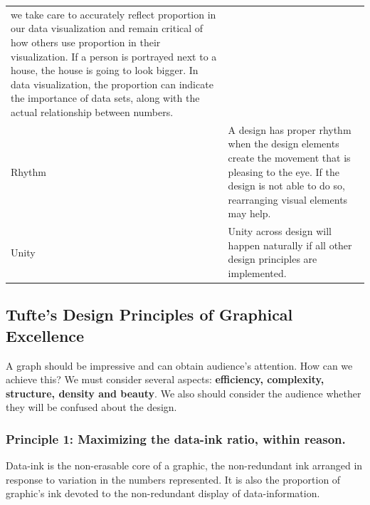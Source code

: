 \documentclass[]{book}
\theoremstyle{definition}
\theoremstyle{definition}
\theoremstyle{definition}
\theoremstyle{remark}
\begin{document}
\begin{longtable}[]{@{}ll@{}}
\begin{minipage}[t]{0.78\columnwidth}
we take care to accurately reflect proportion in our data visualization
and remain critical of how others use proportion in their visualization.
If a person is portrayed next to a house, the house is going to look
bigger. In data visualization, the proportion can indicate the
importance of data sets, along with the actual relationship between
numbers.\strut
\end{minipage}\tabularnewline
\begin{minipage}[t]{0.16\columnwidth}\raggedright\strut
Rhythm\strut
\end{minipage} & \begin{minipage}[t]{0.78\columnwidth}\raggedright\strut
A design has proper rhythm when the design elements create the movement
that is pleasing to the eye. If the design is not able to do so,
rearranging visual elements may help.\strut
\end{minipage}\tabularnewline
\begin{minipage}[t]{0.16\columnwidth}\raggedright\strut
Unity\strut
\end{minipage} & \begin{minipage}[t]{0.78\columnwidth}\raggedright\strut
Unity across design will happen naturally if all other design principles
are implemented.\strut
\end{minipage}\tabularnewline
\bottomrule
\end{longtable}

\subsection{Tufte's Design Principles of Graphical
Excellence}\label{tuftes-design-principles-of-graphical-excellence}

A graph should be impressive and can obtain audience's attention. How
can we achieve this? We must consider several aspects:
\textbf{efficiency, complexity, structure, density and beauty}. We also
should consider the audience whether they will be confused about the
design.

\subsubsection{Principle 1: Maximizing the data-ink ratio, within
reason.}\label{principle-1-maximizing-the-data-ink-ratio-within-reason.}

Data-ink is the non-erasable core of a graphic, the non-redundant ink
arranged in response to variation in the numbers represented. It is also
the proportion of graphic's ink devoted to the non-redundant display of
data-information.
\end{document}
